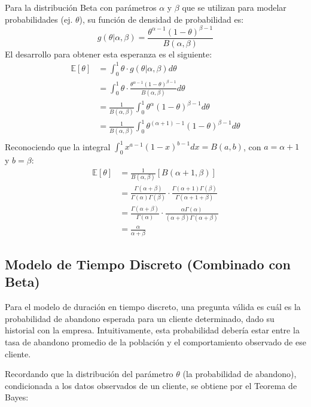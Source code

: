 \documentclass[
]{book}
\begin{document}
\begin{itemize}
  Para la distribución Beta con parámetros \(\alpha\) y \(\beta\) que se
  utilizan para modelar probabilidades (ej. \(\theta\)), su función de
  densidad de probabilidad es:
  \[g(\theta|\alpha,\beta) = \frac{\theta^{\alpha-1}(1-\theta)^{\beta-1}}{B(\alpha,\beta)}\]
  El desarrollo para obtener esta esperanza es el siguiente: \[
  \begin{aligned}
  \mathbb{E}[\theta] &= \int_{0}^{1} \theta \cdot g(\theta|\alpha,\beta) d\theta \\
  &= \int_{0}^{1} \theta \cdot \frac{\theta^{\alpha-1}(1-\theta)^{\beta-1}}{B(\alpha,\beta)} d\theta \\
  &= \frac{1}{B(\alpha,\beta)} \int_{0}^{1} \theta^{\alpha}(1-\theta)^{\beta-1} d\theta \\
  &= \frac{1}{B(\alpha,\beta)} \int_{0}^{1} \theta^{(\alpha+1)-1}(1-\theta)^{\beta-1} d\theta \\
  \end{aligned}
  \] Reconociendo que la integral
  \(\int_{0}^{1} x^{a-1}(1-x)^{b-1}dx = B(a,b)\), con \(a=\alpha+1\) y
  \(b=\beta\): \[
  \begin{aligned}
  \mathbb{E}[\theta] &= \frac{1}{B(\alpha,\beta)} \left[ B(\alpha+1, \beta) \right] \\
  &= \frac{\Gamma(\alpha+\beta)}{\Gamma(\alpha)\Gamma(\beta)} \cdot \frac{\Gamma(\alpha+1)\Gamma(\beta)}{\Gamma(\alpha+1+\beta)} \\
  &= \frac{\Gamma(\alpha+\beta)}{\Gamma(\alpha)} \cdot \frac{\alpha\Gamma(\alpha)}{(\alpha+\beta)\Gamma(\alpha+\beta)} \\
  &= \frac{\alpha}{\alpha+\beta}
  \end{aligned}
  \]
\end{itemize}

\subsection{Modelo de Tiempo Discreto (Combinado con Beta)}\label{modelo-de-tiempo-discreto-combinado-con-beta}

Para el modelo de duración en tiempo discreto, una pregunta válida es
cuál es la probabilidad de abandono esperada para un cliente
determinado, dado su historial con la empresa. Intuitivamente, esta
probabilidad debería estar entre la tasa de abandono promedio de la
población y el comportamiento observado de ese cliente.

Recordando que la distribución del parámetro \(\theta\) (la probabilidad
de abandono), condicionada a los datos observados de un cliente, se
obtiene por el Teorema de Bayes:
\end{document}
